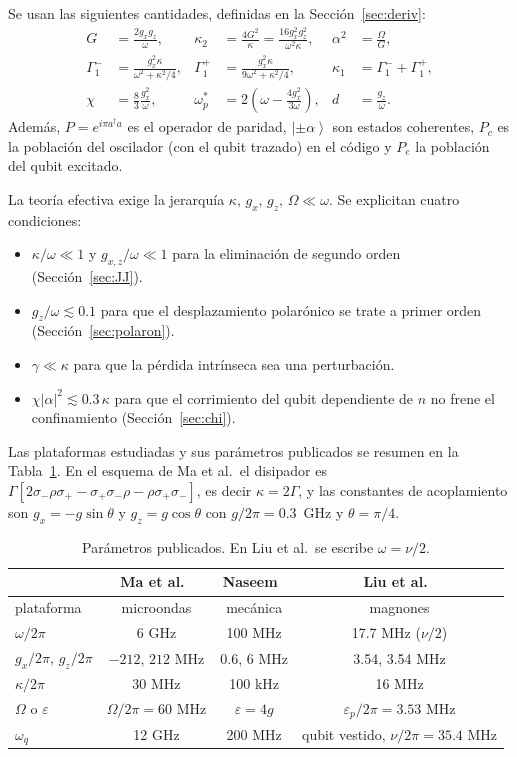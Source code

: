 \documentclass[11pt,a4paper]{article}
\newcommand{\ket}[1]{\left|#1\right\rangle}
\newcommand{\spl}{\sigma_{+}}
\newcommand{\smi}{\sigma_{-}}
\newcommand{\wps}{\omega_p^{*}}
\theoremstyle{definition}
\begin{document}
Se usan las siguientes cantidades, definidas en la Sección~\ref{sec:deriv}:
\begin{align}
G&=\frac{2g_xg_z}{\omega}, & \kappa_2&=\frac{4G^2}{\kappa}=\frac{16g_x^2g_z^2}{\omega^2\kappa}, & \alpha^2&=\frac{\Omega}{G},\nonumber\\
\Gamma_1^{-}&=\frac{g_x^2\kappa}{\omega^2+\kappa^2/4}, & \Gamma_1^{+}&=\frac{g_x^2\kappa}{9\omega^2+\kappa^2/4}, & \kappa_1&=\Gamma_1^{-}+\Gamma_1^{+},\nonumber\\
\chi&=\frac{8}{3}\frac{g_x^2}{\omega}, & \wps&=2\left(\omega-\frac{4g_x^2}{3\omega}\right), & d&=\frac{g_z}{\omega}.
\label{eq:defs}
\end{align}
Además, $P=e^{i\pi a^{\dagger}a}$ es el operador de paridad, $\ket{\pm\alpha}$ son estados coherentes, $P_c$ es la población del oscilador (con el qubit trazado) en el código y $P_e$ la población del qubit excitado.


La teoría efectiva exige la jerarquía $\kappa,\,g_x,\,g_z,\,\Omega\ll\omega$. Se explicitan cuatro condiciones:
\begin{itemize}
\item $\kappa/\omega\ll1$ y $g_{x,z}/\omega\ll1$ para la eliminación de segundo orden (Sección~\ref{sec:JJ}).
\item $g_z/\omega\lesssim0.1$ para que el desplazamiento polarónico se trate a primer orden (Sección~\ref{sec:polaron}).
\item $\gamma\ll\kappa$ para que la pérdida intrínseca sea una perturbación.
\item $\chi|\alpha|^2\lesssim0.3\,\kappa$ para que el corrimiento del qubit dependiente de $n$ no frene el confinamiento (Sección~\ref{sec:chi}).
\end{itemize}


Las plataformas estudiadas y sus parámetros publicados se resumen en la Tabla~\ref{tab:param}. En el esquema de Ma et al.\ el disipador es $\Gamma[2\smi\rho\spl-\spl\smi\rho-\rho\spl\smi]$, es decir $\kappa=2\Gamma$, y las constantes de acoplamiento son $g_x=-g\sin\theta$ y $g_z=g\cos\theta$ con $g/2\pi=0.3$~GHz y $\theta=\pi/4$.

\begin{table}[h]
\centering
\begin{tabular}{lccc}
\toprule
 & Ma et al.~\cite{Ma2019} & Naseem~\cite{Naseem2026} & Liu et al.~\cite{Liu2025}\\
\midrule
plataforma & microondas & mecánica & magnones\\
$\omega/2\pi$ & 6 GHz & 100 MHz & 17.7 MHz ($\nu/2$)\\
$g_x/2\pi$, $g_z/2\pi$ & $-212$, $212$ MHz & 0.6, 6 MHz & 3.54, 3.54 MHz\\
$\kappa/2\pi$ & 30 MHz & 100 kHz & 16 MHz\\
$\Omega$ o $\varepsilon$ & $\Omega/2\pi=60$ MHz & $\varepsilon=4g$ & $\varepsilon_p/2\pi=3.53$ MHz\\
$\omega_q$ & 12 GHz & 200 MHz & qubit vestido, $\nu/2\pi=35.4$ MHz\\
\bottomrule
\end{tabular}
\caption{Parámetros publicados. En Liu et al.\ se escribe $\omega=\nu/2$.}
\label{tab:param}
\end{table}
\end{document}
